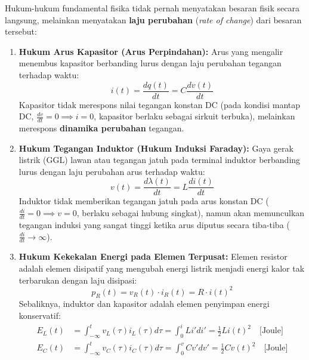 \documentclass[11pt,a4paper]{article}
\theoremstyle{definition}
\begin{document}
Hukum-hukum fundamental fisika tidak pernah menyatakan besaran fisik secara langsung, melainkan menyatakan \textbf{laju perubahan} (\textit{rate of change}) dari besaran tersebut:
\begin{enumerate}
    \item \textbf{Hukum Arus Kapasitor (Arus Perpindahan):}
    Arus yang mengalir menembus kapasitor berbanding lurus dengan laju perubahan tegangan terhadap waktu:
    \begin{equation}
        i(t) = \frac{dq(t)}{dt} = C \frac{dv(t)}{dt}
        \label{eq:capacitor_physics}
    \end{equation}
    Kapasitor tidak merespons nilai tegangan konstan DC (pada kondisi mantap DC, $\frac{dv}{dt} = 0 \implies i = 0$, kapasitor berlaku sebagai sirkuit terbuka), melainkan merespons \textbf{dinamika perubahan} tegangan.
    
    \item \textbf{Hukum Tegangan Induktor (Hukum Induksi Faraday):}
    Gaya gerak listrik (GGL) lawan atau tegangan jatuh pada terminal induktor berbanding lurus dengan laju perubahan arus terhadap waktu:
    \begin{equation}
        v(t) = \frac{d\lambda(t)}{dt} = L \frac{di(t)}{dt}
        \label{eq:inductor_physics}
    \end{equation}
    Induktor tidak memberikan tegangan jatuh pada arus konstan DC ($\frac{di}{dt} = 0 \implies v = 0$, berlaku sebagai hubung singkat), namun akan memunculkan tegangan induksi yang sangat tinggi ketika arus diputus secara tiba-tiba ($\frac{di}{dt} \to \infty$).
    
    \item \textbf{Hukum Kekekalan Energi pada Elemen Terpusat:}
    Elemen resistor adalah elemen disipatif yang mengubah energi listrik menjadi energi kalor tak terbarukan dengan laju disipasi:
    \begin{equation}
        p_R(t) = v_R(t) \cdot i_R(t) = R \cdot i(t)^2
    \end{equation}
    Sebaliknya, induktor dan kapasitor adalah elemen penyimpan energi konservatif:
    \begin{align}
        E_L(t) &= \int_{-\infty}^t v_L(\tau) i_L(\tau) d\tau = \int_0^i L i' di' = \frac{1}{2} L i(t)^2 \quad \text{[Joule]} \\
        E_C(t) &= \int_{-\infty}^t v_C(\tau) i_C(\tau) d\tau = \int_0^v C v' dv' = \frac{1}{2} C v(t)^2 \quad \text{[Joule]}
    \end{align}
\end{enumerate}
\end{document}
